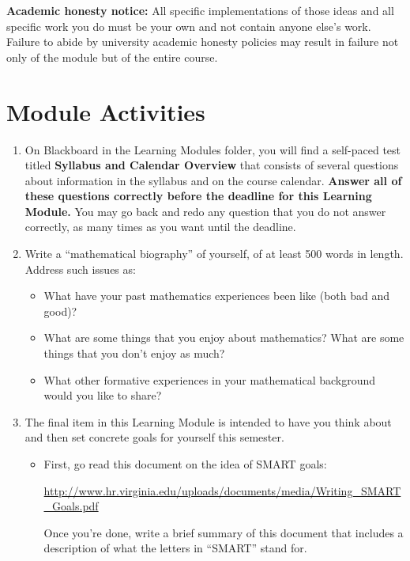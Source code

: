\documentclass[11pt,letterpaper]{article}
\begin{document}
\smallskip

\textbf{Academic honesty notice:} All specific implementations of those ideas and all specific work you do must be your own and not contain anyone else's work. Failure to abide by university academic honesty policies may result in failure not only of the module but of the entire course. 

\section*{Module Activities}

\begin{enumerate}
	\item On Blackboard in the Learning Modules folder, you will find a self-paced test titled \textbf{Syllabus and Calendar Overview} that consists of several questions about information in the syllabus and on the course calendar. \textbf{Answer all of these questions correctly before the deadline for this Learning Module.} You may go back and redo any question that you do not answer correctly, as many times as you want until the deadline. 



	\item Write a ``mathematical biography'' of yourself, of at least 500 words in length. Address such issues as: 
		\begin{itemize}
		 	\item What have your past mathematics experiences been like (both bad and good)? 
		 	\item What are some things that you enjoy about mathematics? What are some things that you don't enjoy as much? 
		 	\item What other formative experiences in your mathematical background would you like to share? 
		 \end{itemize} 

	\item The final item in this Learning Module is intended to have you think about and then set concrete goals for yourself this semester. 
		\begin{itemize}
			\item First, go read this document on the idea of SMART goals: 
			\begin{center}
				\url{http://www.hr.virginia.edu/uploads/documents/media/Writing_SMART_Goals.pdf}
			\end{center}
			Once you're done, write a brief summary of this document that includes a description of what the letters in ``SMART'' stand for. 


\end{itemize}
\end{enumerate}
\end{document}
